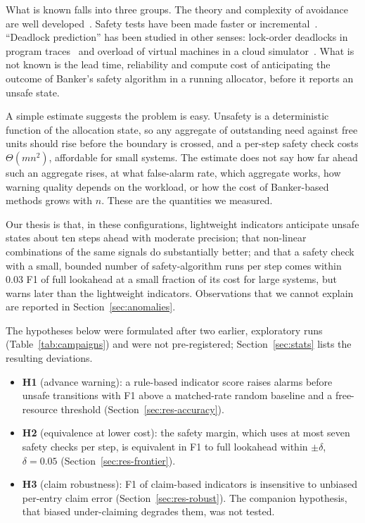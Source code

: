 \documentclass[conference]{IEEEtran}
\begin{document}
What is known falls into three groups. The theory and complexity of avoidance are well developed~\cite{Dijkstra-EWD623,Habermann1969,Gold1978,Minoura1982}. Safety tests have been made faster or incremental~\cite{Belik1987,Finkel1987,Zohora2024}. ``Deadlock prediction'' has been studied in other senses: lock-order deadlocks in program traces~\cite{Tunc2023,Kalhauge2018} and overload of virtual machines in a cloud simulator~\cite{LeNgoc2023}. What is not known is the lead time, reliability and compute cost of anticipating the outcome of Banker's safety algorithm in a running allocator, before it reports an unsafe state.

A simple estimate suggests the problem is easy. Unsafety is a deterministic function of the allocation state, so any aggregate of outstanding need against free units should rise before the boundary is crossed, and a per-step safety check costs $\Theta(mn^2)$, affordable for small systems. The estimate does not say how far ahead such an aggregate rises, at what false-alarm rate, which aggregate works, how warning quality depends on the workload, or how the cost of Banker-based methods grows with $n$. These are the quantities we measured.

Our thesis is that, in these configurations, lightweight indicators anticipate unsafe states about ten steps ahead with moderate precision; that non-linear combinations of the same signals do substantially better; and that a safety check with a small, bounded number of safety-algorithm runs per step comes within 0.03 F1 of full lookahead at a small fraction of its cost for large systems, but warns later than the lightweight indicators. Observations that we cannot explain are reported in Section~\ref{sec:anomalies}.

The hypotheses below were formulated after two earlier, exploratory runs (Table~\ref{tab:campaigns}) and were not pre-registered; Section~\ref{sec:stats} lists the resulting deviations.
\begin{itemize}
\item \textbf{H1} (advance warning): a rule-based indicator score raises alarms before unsafe transitions with F1 above a matched-rate random baseline and a free-resource threshold (Section~\ref{sec:res-accuracy}).
\item \textbf{H2} (equivalence at lower cost): the safety margin, which uses at most seven safety checks per step, is equivalent in F1 to full lookahead within $\pm\delta$, $\delta=0.05$ (Section~\ref{sec:res-frontier}).
\item \textbf{H3} (claim robustness): F1 of claim-based indicators is insensitive to unbiased per-entry claim error (Section~\ref{sec:res-robust}). The companion hypothesis, that biased under-claiming degrades them, was not tested.
\end{itemize}
\end{document}
